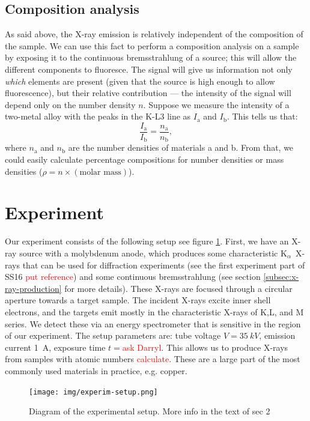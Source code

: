 \documentclass[11pt,a4paper,twoside,onecolumn]{article}
\newcommand{\reminder}[1]{\textcolor{red}{#1}}
\newcommand{\Kalpha}{$\mathrm{K}_\alpha$~}
\begin{document}
\subsection{Composition analysis}
As said above, the X-ray emission is relatively independent of the composition of the sample. We can use this fact to perform a composition analysis on a sample by exposing it to the continuous bremsstrahlung of a source; this will allow the different components to fluoresce. The signal will give us information not only \emph{which} elements are present (given that the source is high enough to allow fluorescence), but their relative contribution --- the intensity of the signal will depend only on the number density $n$. Suppose we measure the intensity of a two-metal alloy with the peaks in the K-L3 line as $I_\mathrm{a}$ and $I_\mathrm{b}$.
This tells us that:
\begin{equation}
    \frac{I_\mathrm{a}}{I_\mathrm{b}} = \frac{n_\mathrm{a}}{n_\mathrm{b}},
\end{equation}
where $n_\mathrm{a}$ and $n_\mathrm{b}$ are the number densities of materials a and b. From that, we could easily calculate percentage compositions for number densities or mass densities ($\rho = n \times (\text{molar mass})$).

\section{Experiment}
Our experiment consists of the following setup see figure \ref{fig:experim-setup}. First, we have an X-ray source with a molybdenum anode, which produces some characteristic \Kalpha X-rays that can be used for diffraction experiments (see the first experiment part of SS16 \reminder{put reference}) and some continuous bremsstrahlung (see section \ref{subsec:x-ray-production} for more details). These X-rays are focused through a circular aperture towards a target sample. The incident X-rays excite inner shell electrons, and the targets emit mostly in the characteristic X-rays of K,L, and M series. We detect these via an energy spectrometer that is sensitive in the region of our experiment. The setup parameters are: tube voltage $V = \SI{35}{kV}$, emission current \SI{1}{A}, exposure time $t=$\reminder{ask Darryl}. This allows us to produce X-rays from samples with atomic numbers \reminder{calculate}. These are a large part of the most commonly used materials in practice, e.g. copper.

\begin{figure}[!htb]
    \centering
    \texttt{[image: img/experim-setup.png]}
    \caption{Diagram of the experimental setup. More info in the text of sec 2 }\label{fig:experim-setup}
\end{figure}
\end{document}

